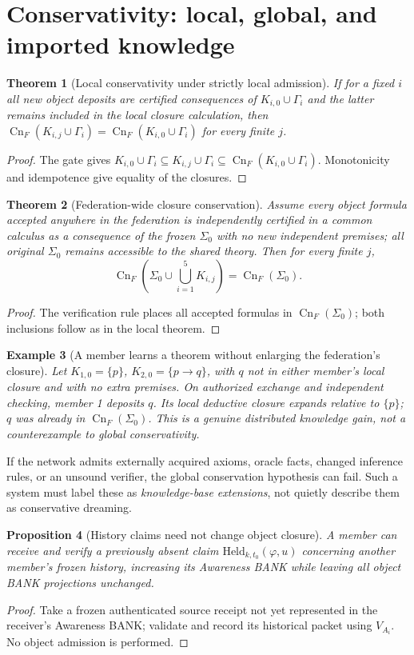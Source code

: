 \documentclass[11pt]{article}
\newtheorem{theorem}{Theorem}[section]
\newtheorem{proposition}[theorem]{Proposition}
\newtheorem{example}[theorem]{Example}
\newcommand{\Cn}{\operatorname{Cn}}
\begin{document}
\section{Conservativity: local, global, and imported knowledge}
\begin{theorem}[Local conservativity under strictly local admission]
If for a fixed $i$ all new object deposits are certified consequences of $K_{i,0}\cup\Gamma_i$ and the latter remains included in the local closure calculation, then $\Cn_F(K_{i,j}\cup\Gamma_i)=\Cn_F(K_{i,0}\cup\Gamma_i)$ for every finite $j$.
\end{theorem}
\begin{proof}The gate gives $K_{i,0}\cup\Gamma_i\subseteq K_{i,j}\cup\Gamma_i\subseteq\Cn_F(K_{i,0}\cup\Gamma_i)$. Monotonicity and idempotence give equality of the closures.\end{proof}
\begin{theorem}[Federation-wide closure conservation]
Assume every object formula accepted anywhere in the federation is independently certified in a common calculus as a consequence of the frozen $\Sigma_0$ with no new independent premises; all original $\Sigma_0$ remains accessible to the shared theory. Then for every finite $j$,
\[\Cn_F\left(\Sigma_0\cup\bigcup_{i=1}^5K_{i,j}\right)=\Cn_F(\Sigma_0).\]
\end{theorem}
\begin{proof}The verification rule places all accepted formulas in $\Cn_F(\Sigma_0)$; both inclusions follow as in the local theorem.\end{proof}
\begin{example}[A member learns a theorem without enlarging the federation's closure]
Let $K_{1,0}=\{p\}$, $K_{2,0}=\{p\to q\}$, with $q$ not in either member's local closure and with no extra premises. On authorized exchange and independent checking, member 1 deposits $q$. Its local deductive closure expands relative to $\{p\}$; $q$ was already in $\Cn_F(\Sigma_0)$. This is a genuine distributed knowledge gain, not a counterexample to global conservativity.
\end{example}
If the network admits externally acquired axioms, oracle facts, changed inference rules, or an unsound verifier, the global conservation hypothesis can fail. Such a system must label these as \emph{knowledge-base extensions}, not quietly describe them as conservative dreaming.
\begin{proposition}[History claims need not change object closure]
A member can receive and verify a previously absent claim $\mathrm{Held}_{k,t_0}(\varphi,u)$ concerning another member's frozen history, increasing its Awareness BANK while leaving all object BANK projections unchanged.
\end{proposition}
\begin{proof}Take a frozen authenticated source receipt not yet represented in the receiver's Awareness BANK; validate and record its historical packet using $V_{A_i}$. No object admission is performed.\end{proof}
\end{document}
